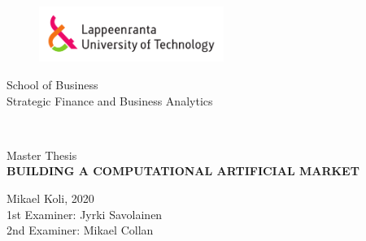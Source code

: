 
\thispagestyle{empty} \setlength{\parindent}{0pt}
\begin{figure}
\includegraphics[width=60mm]{./figs/Merkki_Logo_CMYK}\\
\end{figure}

\begin{flushleft}
    \vspace{60mm}
    School of Business\\
    Strategic Finance and Business Analytics
\end{flushleft}

~\\

\begin{center}
    \vspace{60mm}
    \Large
    \sffamily 
    Master Thesis\\
    \textbf{\MakeUppercase{Building a Computational Artificial Market}}\\

\end{center}

\vspace*{\fill}

\begin{flushright}
    \vspace{50mm}
    Mikael Koli, 2020\\
    1st Examiner: Jyrki Savolainen\\
    2nd Examiner: Mikael Collan
\end{flushright}
